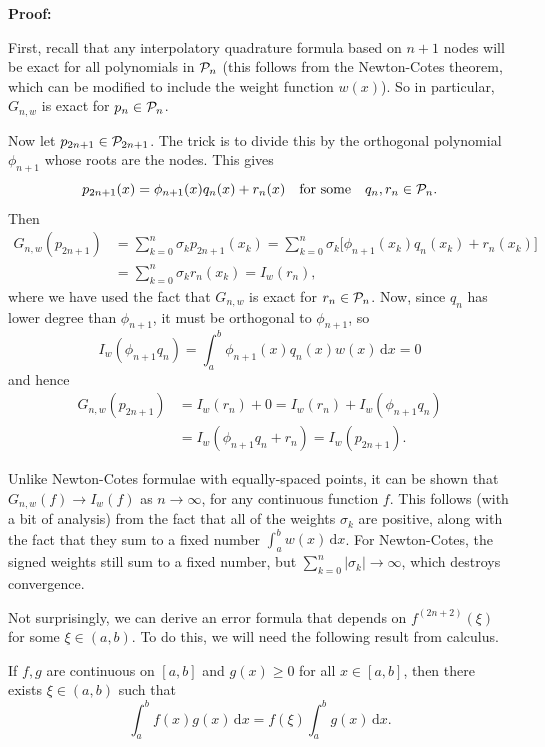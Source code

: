 \documentclass[
  letterpaper,
  DIV=11,
  numbers=noendperiod]{scrreprt}
\newenvironment{fbxSimple}[3]{\begin{tcolorbox}[enhanced, breakable,%
attach boxed title to top*={xshift=1.4pt},
boxed title style={boxrule=0.0mm, fuzzy shadow={1pt}{-1pt}{0mm}{0.1mm}{gray}, arc=.3em, rounded corners=east, sharp corners=west}, colframe=#1-color2, colbacktitle=#1-color1, colback = white, coltitle=black,  titlerule=0mm, toprule=0pt, bottomrule=.7pt, leftrule=.3em, rightrule=.7pt, outer arc=.3em,  	left=.5em, right=.5em, bottomtitle=1mm, toptitle=1mm,title=\textbf{#2}\hspace{0.5em}{#3}]}
{\end{tcolorbox}}
\begin{document}
\textbf{Proof:}

First, recall that any interpolatory quadrature formula based on \(n+1\)
nodes will be exact for all polynomials in \({\cal P}_n\) (this follows
from the Newton-Cotes theorem, which can be modified to include the
weight function \(w(x)\)). So in particular, \(G_{n,w}\) is exact for
\(p_n\in{\cal P}_n\).

Now let \(p_{2n+1}\in{\cal P}_{2n+1}\). The trick is to divide this by
the orthogonal polynomial \(\phi_{n+1}\) whose roots are the nodes. This
gives \[
p_{2n+1}(x) = \phi_{n+1}(x)q_n(x) + r_n(x) \quad \textrm{for some} \quad q_n,r_n \in{\cal P}_n.
\] Then \[
\begin{aligned}
G_{n,w}(p_{2n+1}) &= \sum_{k=0}^n\sigma_kp_{2n+1}(x_k) = \sum_{k=0}^n\sigma_k\Big[\phi_{n+1}(x_k)q_n(x_k) + r_n(x_k) \Big] \\ &= \sum_{k=0}^n\sigma_kr_n(x_k) = I_w(r_n),
\end{aligned}
\] where we have used the fact that \(G_{n,w}\) is exact for
\(r_n\in{\cal P}_n\). Now, since \(q_n\) has lower degree than
\(\phi_{n+1}\), it must be orthogonal to \(\phi_{n+1}\), so \[
I_w(\phi_{n+1}q_n) = \int_a^b\phi_{n+1}(x)q_n(x)w(x)\,\mathrm{d}x = 0
\] and hence \[
\begin{aligned}
G_{n,w}(p_{2n+1}) &= I_w(r_n) + 0= I_w(r_n) + I_w(\phi_{n+1}q_n) \\ &= I_w( \phi_{n+1}q_n + r_n) = I_w(p_{2n+1}).
\end{aligned}
\]

Unlike Newton-Cotes formulae with equally-spaced points, it can be shown
that \(G_{n,w}(f)\to I_w(f)\) as \(n\to\infty\), for any continuous
function \(f\). This follows (with a bit of analysis) from the fact that
all of the weights \(\sigma_k\) are positive, along with the fact that
they sum to a fixed number \(\int_a^bw(x)\,\mathrm{d}x\). For
Newton-Cotes, the signed weights still sum to a fixed number, but
\(\sum_{k=0}^n|\sigma_k|\to\infty\), which destroys convergence.

Not surprisingly, we can derive an error formula that depends on
\(f^{(2n+2)}(\xi)\) for some \(\xi\in(a,b)\). To do this, we will need
the following result from calculus.

\label{mean-value-theorem-for-integrals}
\begin{fbxSimple}{theorem}{Theorem 4.4: }{Mean value theorem for integrals}
\label{mean-value-theorem-for-integrals}
If \(f,g\) are continuous on \([a,b]\) and \(g(x)\geq 0\) for all
\(x\in[a,b]\), then there exists \(\xi\in(a,b)\) such that \[
\int_a^bf(x)g(x)\,\mathrm{d}x = f(\xi)\int_a^bg(x)\,\mathrm{d}x.
\]

\end{fbxSimple}
\end{document}
